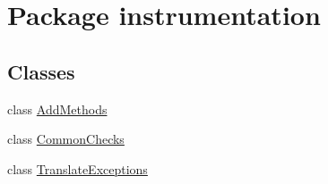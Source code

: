 \hypertarget{namespaceinstrumentation}{}\section{Package instrumentation}
\label{namespaceinstrumentation}
\subsection*{Classes}
\begin{DoxyCompactItemize}
\item 
class \mbox{\hyperlink{classinstrumentation_1_1_add_methods}{Add\+Methods}}
\item 
class \mbox{\hyperlink{classinstrumentation_1_1_common_checks}{Common\+Checks}}
\item 
class \mbox{\hyperlink{classinstrumentation_1_1_translate_exceptions}{Translate\+Exceptions}}
\end{DoxyCompactItemize}
